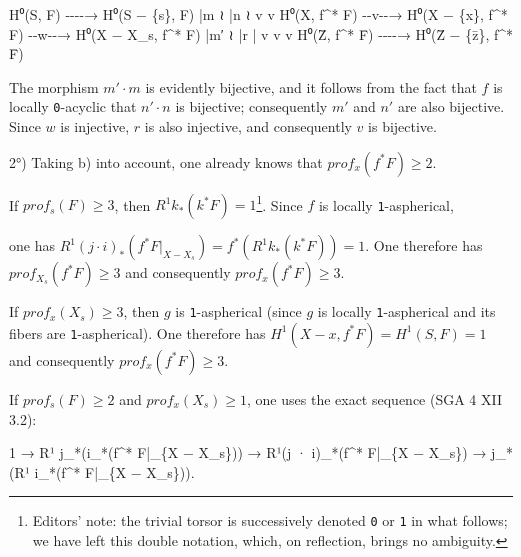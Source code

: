 \documentclass[
]{article}
\newenvironment{Shaded}{}{}
\newcommand{\NormalTok}[1]{#1}
\begin{document}
\begin{Shaded}
\begin{Highlighting}[]
\NormalTok{H⁰(S, F) {-}{-}{-}{-}→ H⁰(S − \{s\}, F)}
\NormalTok{   |m ≀                |n ≀}
\NormalTok{   v                    v}
\NormalTok{H⁰(X, f\^{}* F) {-}{-}v{-}{-}→ H⁰(X − \{x\}, f\^{}* F) {-}{-}w{-}{-}→ H⁰(X − X\_s, f\^{}* F)}
\NormalTok{   |m′ ≀                |r                       |}
\NormalTok{   v                    v                        v}
\NormalTok{H⁰(Z̄, f\^{}* F̄) {-}{-}{-}{-}→  H⁰(Z̄ − \{z̄\}, f\^{}* F̄)}
\end{Highlighting}
\end{Shaded}

The morphism \(m' \cdot m\) is evidently bijective, and it follows from
the fact that \(f\) is locally \texttt{0}-acyclic that \(n' \cdot n\) is
bijective; consequently \(m'\) and \(n'\) are also bijective. Since
\(w\) is injective, \(r\) is also injective, and consequently \(v\) is
bijective.

2°) Taking b) into account, one already knows that
\(prof_{x}(f^{*} F) \geqslant 2\).

If \(prof_{s}(F) \geqslant 3\), then
\(R^{1} k_{*}(k^{*} F) = 1\)\footnote{Editors' note: the trivial torsor
  is successively denoted \texttt{0} or \texttt{1} in what follows; we
  have left this double notation, which, on reflection, brings no
  ambiguity.}. Since \(f\) is locally \texttt{1}-aspherical,

one has
\(R^{1}(j \cdot i)_{*}(f^{*} F|_{X - X_{s}}) = f^{*}(R^{1} k_{*}(k^{*} F)) = 1\).
One therefore has \(prof_{X_{s}}(f^{*} F) \geqslant 3\) and consequently
\(prof_{x}(f^{*} F) \geqslant 3\).

If \(prof_{x}(X_{s}) \geqslant 3\), then \(g\) is \texttt{1}-aspherical
(since \(g\) is locally \texttt{1}-aspherical and its fibers are
\texttt{1}-aspherical). One therefore has
\(H^{1}(X - {x}, f^{*} F) = H^{1}(S, F) = 1\) and consequently
\(prof_{x}(f^{*} F) \geqslant 3\).

If \(prof_{s}(F) \geqslant 2\) and \(prof_{x}(X_{s}) \geqslant 1\), one
uses the exact sequence (SGA 4 XII 3.2):

\begin{Shaded}
\begin{Highlighting}[]
\NormalTok{1 → R¹ j\_*(i\_*(f\^{}* F|\_\{X − X\_s\})) → R¹(j · i)\_*(f\^{}* F|\_\{X − X\_s\}) → j\_*(R¹ i\_*(f\^{}* F|\_\{X − X\_s\})).}
\end{Highlighting}
\end{Shaded}
\end{document}
